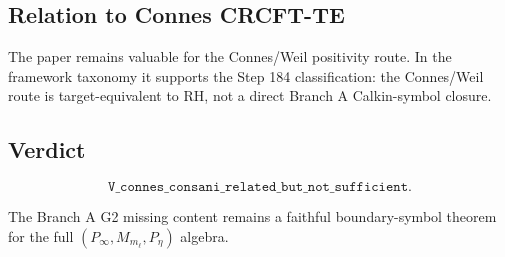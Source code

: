 \documentclass[11pt]{article}
\begin{document}
\subsection*{Relation to Connes CRCFT-TE}

The paper remains valuable for the Connes/Weil positivity route.  In the
framework taxonomy it supports the Step 184 classification: the Connes/Weil
route is target-equivalent to RH, not a direct Branch A Calkin-symbol closure.

\subsection*{Verdict}

\[
\boxed{\texttt{V\_connes\_consani\_related\_but\_not\_sufficient}.}
\]

The Branch A G2 missing content remains a faithful boundary-symbol theorem for
the full \((P_\infty,M_{m_\ell},P_\eta)\) algebra.
\end{document}
